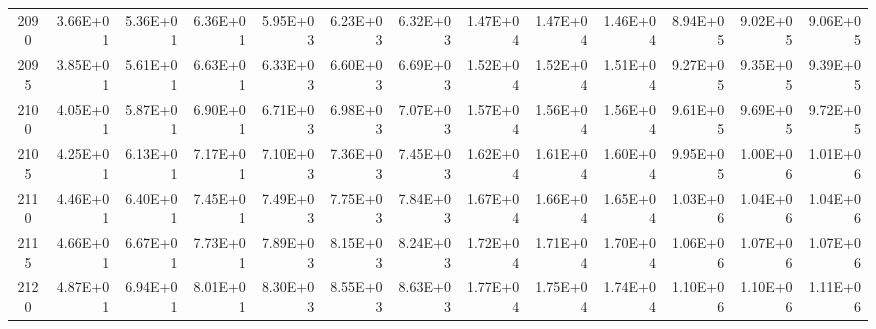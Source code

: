\documentclass{article}
\begin{document}
\begin{table}
\begin{tabular}{crrr|rrr|rrr|rrr}
2090     & 3.66E+01 & 5.36E+01 & 6.36E+01 & 5.95E+03 & 6.23E+03 & 6.32E+03 & 1.47E+04 & 1.47E+04 & 1.46E+04 & 8.94E+05 & 9.02E+05 & 9.06E+05 \\
2095     & 3.85E+01 & 5.61E+01 & 6.63E+01 & 6.33E+03 & 6.60E+03 & 6.69E+03 & 1.52E+04 & 1.52E+04 & 1.51E+04 & 9.27E+05 & 9.35E+05 & 9.39E+05 \\
2100     & 4.05E+01 & 5.87E+01 & 6.90E+01 & 6.71E+03 & 6.98E+03 & 7.07E+03 & 1.57E+04 & 1.56E+04 & 1.56E+04 & 9.61E+05 & 9.69E+05 & 9.72E+05 \\
2105     & 4.25E+01 & 6.13E+01 & 7.17E+01 & 7.10E+03 & 7.36E+03 & 7.45E+03 & 1.62E+04 & 1.61E+04 & 1.60E+04 & 9.95E+05 & 1.00E+06 & 1.01E+06 \\
2110     & 4.46E+01 & 6.40E+01 & 7.45E+01 & 7.49E+03 & 7.75E+03 & 7.84E+03 & 1.67E+04 & 1.66E+04 & 1.65E+04 & 1.03E+06 & 1.04E+06 & 1.04E+06 \\
2115     & 4.66E+01 & 6.67E+01 & 7.73E+01 & 7.89E+03 & 8.15E+03 & 8.24E+03 & 1.72E+04 & 1.71E+04 & 1.70E+04 & 1.06E+06 & 1.07E+06 & 1.07E+06 \\
2120     & 4.87E+01 & 6.94E+01 & 8.01E+01 & 8.30E+03 & 8.55E+03 & 8.63E+03 & 1.77E+04 & 1.75E+04 & 1.74E+04 & 1.10E+06 & 1.10E+06 & 1.11E+06
\end{tabular}
\end{table}
\end{document}
